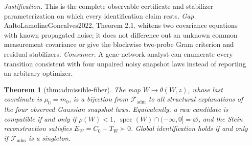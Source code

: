 \documentclass{article}
\newtheorem{theorem}{Theorem}
\begin{document}
\par\smallskip\noindent \textit{Justification.} This is the complete observable certificate and stabilizer parameterization on which every identification claim rests. \textit{Gap.} AaltoLamolineGoncalves2022, Theorem 2.1, whitens two covariance equations with known propagated noise; it does not difference out an unknown common measurement covariance or give the blockwise two-probe Gram criterion and residual stabilizers. \textit{Consumer.} A gene-network analyst can enumerate every transition consistent with four unpaired noisy snapshot laws instead of reporting an arbitrary optimizer.

\begin{theorem}[thm:admissible-fiber]\label{thm:admissible-fiber}
The map \(W\mapsto\theta(W,z)\), whose last coordinate is \(\mu_0=m_0\), is a bijection from \(\mathcal F_{\mathrm{adm}}\) to all structural explanations of the four observed Gaussian snapshot laws. Equivalently, a raw candidate is compatible if and only if \(\rho(W)<1\), \(\operatorname{spec}(W)\cap(-\infty,0]=\varnothing\), and the Stein reconstruction satisfies \(E_W=C_0-T_W\succ0\). Global identification holds if and only if \(\mathcal F_{\mathrm{adm}}\) is a singleton.
\end{theorem}
\end{document}
